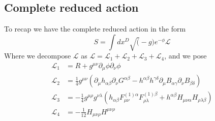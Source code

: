 \documentclass{article}
\begin{document}
\subsection{Complete reduced action}
To recap we have the complete reduced action in the form
\begin{equation}
    S =  \int dx^D \sqrt(-g)e^{-\phi} \mathcal{L}
\end{equation}
Where we decompose $\mathcal{L}$ as $\mathcal{L} = \mathcal{L}_1 + \mathcal{L}_2 + \mathcal{L}_3 +\mathcal{L}_4$, and we pose
\begin{equation} \label{eq:38}
    \boxed{
    \begin{aligned}
        \mathcal{L}_1 &= R +g^{\mu \nu}\partial_{\mu }\phi \partial_{\nu} \phi\\
        \mathcal{L}_2 &=\frac{1}{4}g^{\mu \nu }(\partial_\mu h_{\alpha \beta}\partial_\nu G^{\alpha \beta} - h^{\alpha \beta } h^{\gamma \delta}\partial_\mu B_{\alpha \gamma} \partial_\nu B_{\beta \delta})\\
        \mathcal{L}_3 &= -\frac{1}{4}g^{\mu \rho}g^{\nu \lambda}(h_{\alpha\beta}F^{(1)\alpha}_{\mu \nu}F^{(1)\beta}_{\rho \lambda}+h^{\alpha \beta}H_{\mu \nu \alpha}H_{\rho \lambda \beta })\\
        \mathcal{L}_4 &= -\frac{1}{12}H_{\mu \nu \rho} H^{\mu \nu \rho}
    \end{aligned}}
\end{equation}
\end{document}
